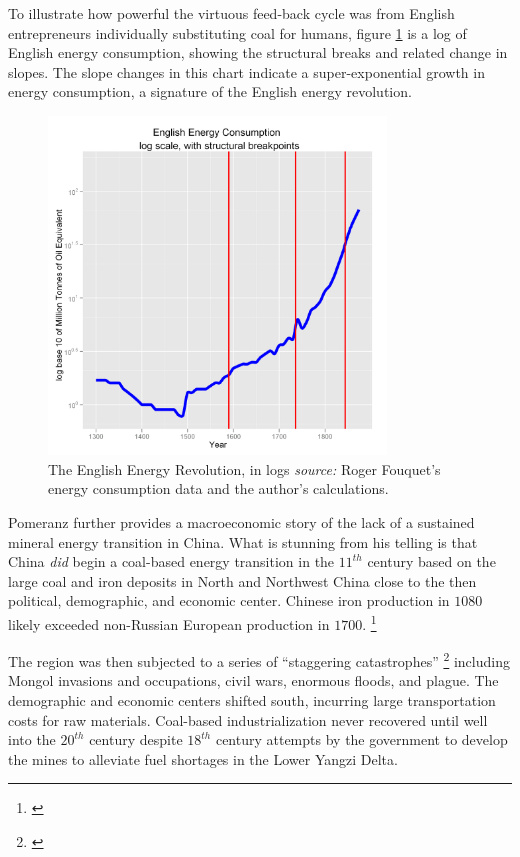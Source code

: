 \documentclass[12pt]{article}
\numberwithin{equation}{section}
\begin{document}
		To illustrate how powerful the virtuous feed-back cycle was from English entrepreneurs individually substituting coal for humans, figure \ref{fig:mtoe_log} is a log of English energy consumption, showing the structural breaks and related change in slopes. The slope changes in this chart indicate a super-exponential growth in energy consumption, a signature of the English energy revolution.

		\begin{figure}[ftb]
		\centering
		\includegraphics[width=0.8\textwidth]{gbpmtoelog.png}
		\caption{The English Energy Revolution, in logs \textit{source:} Roger Fouquet's energy consumption data and the author's calculations.} 
		\label{fig:mtoe_log}
		\end{figure} 		
				
		Pomeranz further provides a macroeconomic story of the lack of a sustained mineral energy transition in China. What is stunning from his telling is that China \textit{did} begin a coal-based energy transition in the $11^{th}$ century based on the large coal and iron deposits in North and Northwest China close to the then political, demographic, and economic center. Chinese iron production in $1080$ likely exceeded non-Russian European production in $1700$. \footnote{\citet[p.~62]{pomeranz_great_2001}}
		
		The region was then subjected to a series of ``staggering catastrophes'' \footnote{\citet[p.~62]{pomeranz_great_2001}} including Mongol invasions and occupations, civil wars, enormous floods, and plague. The demographic and economic centers shifted south, incurring large transportation costs for raw materials. Coal-based industrialization never recovered until well into the $20^{th}$ century despite $18^{th}$ century attempts by the government to develop the mines to alleviate fuel shortages in the Lower Yangzi Delta.
		
\end{document}
